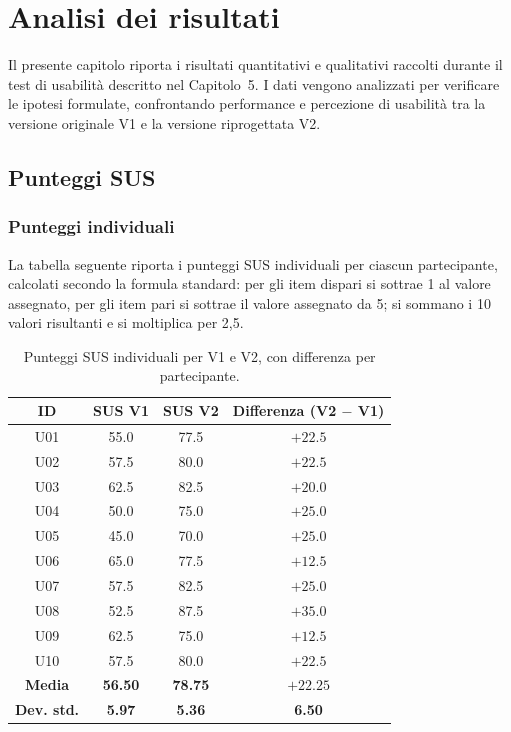 \chapter{Analisi dei risultati}
\label{ch:analisi}

Il presente capitolo riporta i risultati quantitativi e qualitativi raccolti durante il test di usabilità descritto nel Capitolo~5. I dati vengono analizzati per verificare le ipotesi formulate, confrontando performance e percezione di usabilità tra la versione originale V1 e la versione riprogettata V2.

\section{Punteggi SUS}

\subsection{Punteggi individuali}

La tabella seguente riporta i punteggi SUS individuali per ciascun partecipante, calcolati secondo la formula standard: per gli item dispari si sottrae 1 al valore assegnato, per gli item pari si sottrae il valore assegnato da 5; si sommano i 10 valori risultanti e si moltiplica per 2,5.

\begin{table}[H]
\centering
\renewcommand{\arraystretch}{1.4}
\small
\begin{tabular}{|c|c|c|c|}
\hline
\textbf{ID} & \textbf{SUS V1} & \textbf{SUS V2} & \textbf{Differenza (V2 $-$ V1)} \\
\hline
U01 & 55.0 & 77.5 & $+22.5$ \\ \hline
U02 & 57.5 & 80.0 & $+22.5$ \\ \hline
U03 & 62.5 & 82.5 & $+20.0$ \\ \hline
U04 & 50.0 & 75.0 & $+25.0$ \\ \hline
U05 & 45.0 & 70.0 & $+25.0$ \\ \hline
U06 & 65.0 & 77.5 & $+12.5$ \\ \hline
U07 & 57.5 & 82.5 & $+25.0$ \\ \hline
U08 & 52.5 & 87.5 & $+35.0$ \\ \hline
U09 & 62.5 & 75.0 & $+12.5$ \\ \hline
U10 & 57.5 & 80.0 & $+22.5$ \\ \hline
\hline
\textbf{Media} & \textbf{56.50} & \textbf{78.75} & $+\mathbf{22.25}$ \\ \hline
\textbf{Dev. std.} & \textbf{5.97} & \textbf{5.36} & \textbf{6.50} \\ \hline
\end{tabular}
\caption{Punteggi SUS individuali per V1 e V2, con differenza per partecipante.}
\label{tab:sus}
\end{table}

